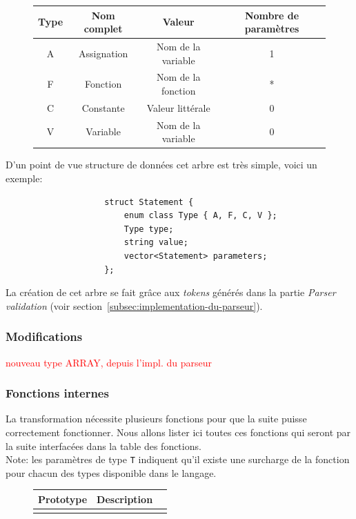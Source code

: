 \documentclass[french]{article}
\begin{document}
			\begin{figure}[H]
				\centering
				\begin{tabular}{cccc}
					Type & Nom complet & Valeur & Nombre de paramètres\\
					\hline
					A & Assignation & Nom de la variable & 1\\
					F & Fonction & Nom de la fonction & *\\
					C & Constante & Valeur littérale & 0\\
					V & Variable & Nom de la variable & 0\\
				\end{tabular}
			\end{figure}
			
			D'un point de vue structure de données cet arbre est très simple, voici un exemple:
			
			\begin{lstlisting}
					struct Statement {
						enum class Type { A, F, C, V };
						Type type;
						string value;
						vector<Statement> parameters;
					};
			\end{lstlisting}
			
			La création de cet arbre se fait grâce aux \textit{tokens} générés dans la partie \textit{Parser validation} (voir section~\ref{subsec:implementation-du-parseur}).
			
			\subsubsection{Modifications}
				\textcolor{red}{nouveau type ARRAY, depuis l'impl. du parseur}
			
			\subsubsection{Fonctions internes}
				La transformation nécessite plusieurs fonctions pour que la suite puisse correctement fonctionner. Nous allons lister ici toutes ces fonctions qui seront par la suite interfacées dans la table des fonctions.\\
				
				Note: les paramètres de type \texttt{T} indiquent qu'il existe une surcharge de la fonction pour chacun des types disponible dans le langage.
				
				\begin{figure}[H]
					\centering
					\begin{tabular}{lll}
						Prototype & Description\\
						\hline
						\texttt{} & \\
					\end{tabular}
				\end{figure}
			
\end{document}
